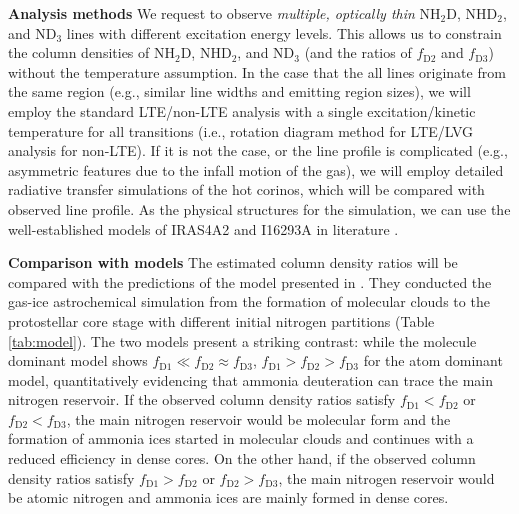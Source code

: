 \documentclass[12pt,a4paper]{article}  %
\begin{document}
\smallskip
\noindent \textbf{Analysis methods} \quad We request to observe \emph{multiple, optically thin} NH$_2$D, NHD$_2$, and ND$_3$ lines with different excitation energy levels. This allows us to constrain the column densities of NH$_2$D, NHD$_2$, and ND$_3$ (and the ratios of $f_\mathrm{D2}$ and $f_\mathrm{D3}$) without the temperature assumption. In the case that the all lines originate from the same region (e.g., similar line widths and emitting region sizes), we will employ the standard LTE/non-LTE analysis with a single excitation/kinetic temperature for all transitions (i.e., rotation diagram method for LTE/LVG analysis for non-LTE). If it is not the case, or the line profile is complicated (e.g., asymmetric features due to the infall motion of the gas), we will employ detailed radiative transfer simulations of the hot corinos, which will be compared with observed line profile. As the physical structures for the simulation, we can use the well-established models of IRAS4A2 and I16293A in literature \citep[e.g.,][]{Persson16, Jacobsen18}. %

\smallskip
\noindent \textbf{Comparison with models} \quad The estimated column density ratios will be compared with the predictions of the model presented in \citet{Furuya18}. They conducted the gas-ice astrochemical simulation from the formation of molecular clouds to the protostellar core stage with different initial nitrogen partitions (Table \ref{tab:model}). The two models present a striking contrast: while the molecule dominant model shows $f_\mathrm{D1} \ll f_\mathrm{D2} \approx f_\mathrm{D3}$, $f_\mathrm{D1} > f_\mathrm{D2} > f_\mathrm{D3}$ for the atom dominant model, quantitatively evidencing that ammonia deuteration can trace the main nitrogen reservoir. If the observed column density ratios satisfy $f_\mathrm{D1} < f_\mathrm{D2}$ or $f_\mathrm{D2} < f_\mathrm{D3}$, the main nitrogen reservoir would be molecular form and the formation of ammonia ices started in molecular clouds and continues with a reduced efficiency in dense cores. On the other hand, if the observed column density ratios satisfy $f_\mathrm{D1} > f_\mathrm{D2}$ or $f_\mathrm{D2} > f_\mathrm{D3}$, the main nitrogen reservoir would be atomic nitrogen and ammonia ices are mainly formed in dense cores.  
\end{document}
